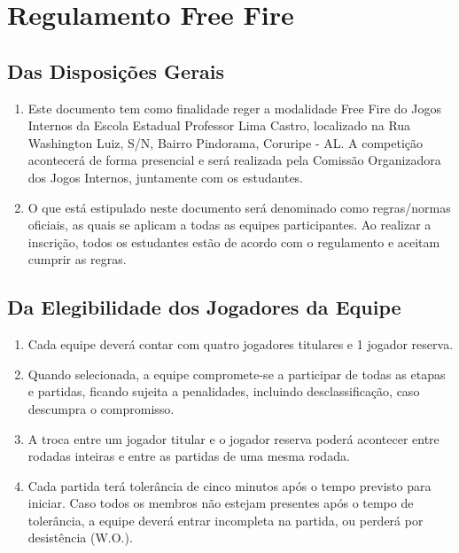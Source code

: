 \chapter*{Regulamento Free Fire}
\section*{Das Disposições Gerais}
\label{cap:intro}

\begin{enumerate}[start=1,label={\bfseries Art. \arabic*$^\circ$ - }]

    \item Este documento tem como finalidade reger a modalidade Free Fire do Jogos
        Internos da Escola Estadual Professor Lima Castro, localizado na Rua
        Washington Luiz, S/N, Bairro Pindorama, Coruripe - AL. A competição acontecerá de forma
        presencial e será realizada pela Comissão Organizadora dos Jogos Internos, juntamente com os estudantes.

    \item O que está estipulado neste documento será denominado como regras/normas oficiais, as
    quais se aplicam a todas as equipes participantes. Ao realizar a inscrição,
    todos os estudantes estão de acordo com o regulamento e aceitam cumprir as regras.

\end{enumerate}

\section*{Da Elegibilidade dos Jogadores da Equipe}
\label{sec:motivacao}

\begin{enumerate}[start=1,label={\bfseries Art. \arabic*$^\circ$ - }, resume]
    \item Cada equipe deverá contar com quatro jogadores titulares e 1 jogador reserva.
    \item Quando selecionada, a equipe compromete-se a participar de todas as
        etapas e partidas, ficando sujeita a penalidades, incluindo desclassificação,
        caso descumpra o compromisso.
    \item A troca entre um jogador titular e o jogador reserva poderá acontecer
        entre rodadas inteiras e entre as partidas de uma mesma rodada.
    \item Cada partida terá tolerância de cinco minutos após o tempo previsto para
        iniciar.
        Caso todos os membros não estejam presentes após o tempo de tolerância, a
        equipe deverá entrar incompleta na partida, ou perderá por desistência (W.O.).
\end{enumerate}

